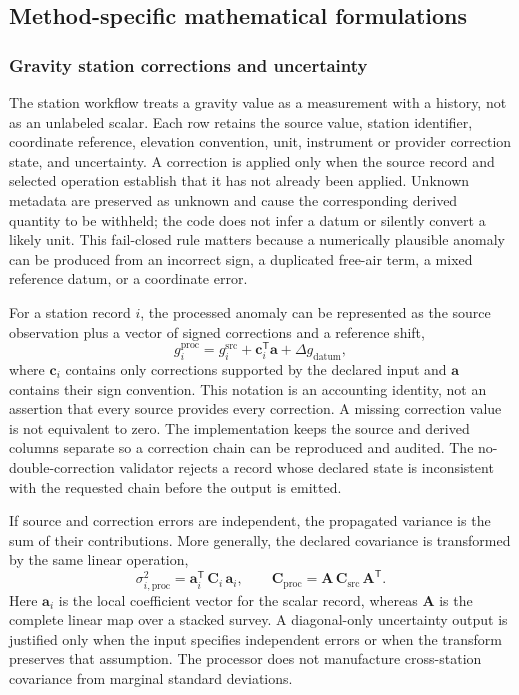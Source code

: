 \subsection{Method-specific mathematical formulations}
\label{method-formulations}

\subsubsection{Gravity station corrections and uncertainty}
\label{method-gravity-corrections}

The station workflow treats a gravity value as a measurement with a
history, not as an unlabeled scalar. Each row retains the source value,
station identifier, coordinate reference, elevation convention, unit,
instrument or provider correction state, and uncertainty. A correction
is applied only when the source record and selected operation establish
that it has not already been applied. Unknown metadata are preserved as
unknown and cause the corresponding derived quantity to be withheld;
the code does not infer a datum or silently convert a likely unit.
This fail-closed rule matters because a numerically plausible anomaly
can be produced from an incorrect sign, a duplicated free-air term, a
mixed reference datum, or a coordinate error.

For a station record $i$, the processed anomaly can be represented as
the source observation plus a vector of signed corrections and a
reference shift,
\begin{equation}
  g_i^{\mathrm{proc}} = g_i^{\mathrm{src}} + \mathbf{c}_i^{\mathsf T}\mathbf{a}
  + \Delta g_{\mathrm{datum}},
  \label{eq:gravity-corrections}
\end{equation}
where $\mathbf{c}_i$ contains only corrections supported by the
declared input and $\mathbf{a}$ contains their sign convention. This
notation is an accounting identity, not an assertion that every source
provides every correction. A missing correction value is not equivalent
to zero. The implementation keeps the source and derived columns
separate so a correction chain can be reproduced and audited. The
no-double-correction validator rejects a record whose declared state is
inconsistent with the requested chain before the output is emitted.

If source and correction errors are independent, the propagated
variance is the sum of their contributions. More generally, the
declared covariance is transformed by the same linear operation,
\begin{equation}
  \sigma_{i,\mathrm{proc}}^2 = \mathbf{a}_i^{\mathsf T}\,\mathbf{C}_i\,\mathbf{a}_i,
  \qquad
  \mathbf{C}_{\mathrm{proc}} = \mathbf{A}\,\mathbf{C}_{\mathrm{src}}\,\mathbf{A}^{\mathsf T}.
  \label{eq:gravity-uncertainty}
\end{equation}
Here $\mathbf{a}_i$ is the local coefficient vector for the scalar
record, whereas $\mathbf{A}$ is the complete linear map over a stacked
survey. A diagonal-only uncertainty output is justified only when the
input specifies independent errors or when the transform preserves
that assumption. The processor does not manufacture cross-station
covariance from marginal standard deviations.

